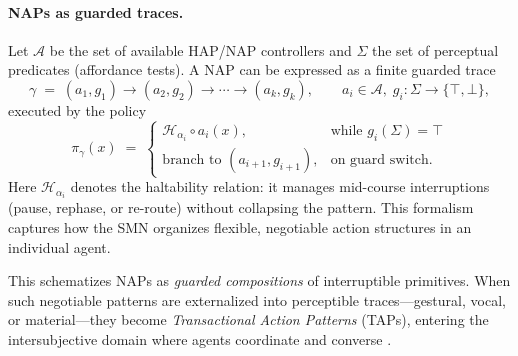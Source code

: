 \paragraph{NAPs as guarded traces.}
Let $\mathcal{A}$ be the set of available HAP/NAP controllers and $\Sigma$ the set of perceptual predicates (affordance tests). 
A NAP can be expressed as a finite guarded trace
\[
\gamma \;=\; (a_1, g_1)\to (a_2, g_2)\to \cdots \to (a_k, g_k), 
\qquad a_i\in \mathcal{A},\; g_i:\Sigma\to\{\top,\bot\},
\]
executed by the policy
\[
\pi_\gamma(x) \;=\; 
\begin{cases}
\mathcal{H}_{\alpha_i}\!\circ a_i(x), & \text{while } g_i(\Sigma)=\top \\[4pt]
\text{branch to } (a_{i+1},g_{i+1}), & \text{on guard switch}.
\end{cases}
\]
Here $\mathcal{H}_{\alpha_i}$ denotes the haltability relation: it manages mid-course interruptions (pause, rephase, or re-route) without collapsing the pattern. 
This formalism captures how the SMN organizes flexible, negotiable action structures in an individual agent.

This schematizes NAPs as \emph{guarded compositions} of interruptible primitives. 
When such negotiable patterns are externalized into perceptible traces—gestural, vocal, or material—they become \emph{Transactional Action Patterns} (TAPs), entering the intersubjective domain where agents coordinate and converse \citep{Gibson1979,PezzuloCisek2016}.

